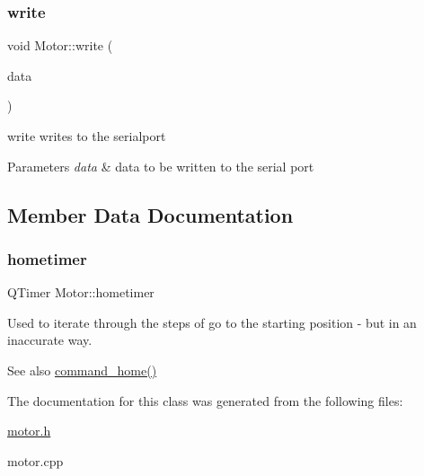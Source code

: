 \subsubsection{\texorpdfstring{write}{write}}
{\footnotesize\ttfamily void Motor\+::write (\begin{DoxyParamCaption}\item[{const Q\+Byte\+Array \&}]{data }\end{DoxyParamCaption})\hspace{0.3cm}{\ttfamily [slot]}}



write writes to the serialport 


\begin{DoxyParams}{Parameters}
{\em data} & data to be written to the serial port \\
\hline
\end{DoxyParams}


\subsection{Member Data Documentation}
\mbox{\label{classMotor_adbb59f89d592f1569ba8ad05c5c58a73}} 
\subsubsection{\texorpdfstring{hometimer}{hometimer}}
{\footnotesize\ttfamily Q\+Timer Motor\+::hometimer\hspace{0.3cm}{\ttfamily [private]}}



Used to iterate through the steps of \textquotesingle{}go to the starting position\textquotesingle{} -\/ but in an inaccurate way. 

\begin{DoxySeeAlso}{See also}
\hyperlink{classMotor_a75c8443fde45f5dc88e7bfe12db75a88}{command\+\_\+home()} 
\end{DoxySeeAlso}


The documentation for this class was generated from the following files\+:\begin{DoxyCompactItemize}
\item 
\hyperlink{motor_8h}{motor.\+h}\item 
motor.\+cpp\end{DoxyCompactItemize}
